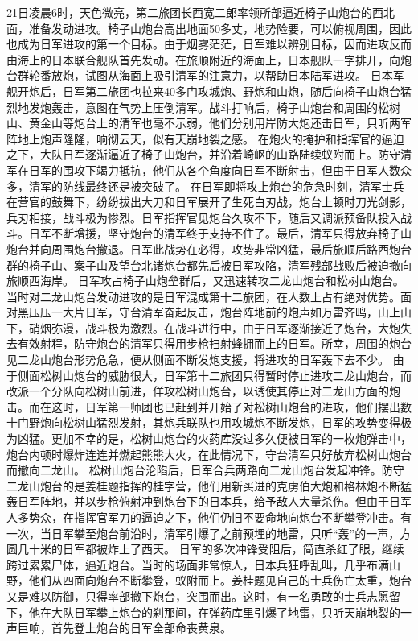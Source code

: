 \documentclass[12pt,UTF8]{ctexbook}
\begin{document}
21日凌晨6时，天色微亮，第二旅团长西宽二郎率领所部逼近椅子山炮台的西北面，准备发动进攻。椅子山炮台高出地面50多丈，地势险要，可以俯视周围，因此也成为日军进攻的第一个目标。由于烟雾茫茫，日军难以辨别目标，因而进攻反而由海上的日本联合舰队首先发动。在旅顺附近的海面上，日本舰队一字排开，向炮台群轮番放炮，试图从海面上吸引清军的注意力，以帮助日本陆军进攻。
日本军舰开炮后，日军第二旅团也拉来40多门攻城炮、野炮和山炮，随后向椅子山炮台猛烈地发炮轰击，意图在气势上压倒清军。战斗打响后，椅子山炮台和周围的松树山、黄金山等炮台上的清军也毫不示弱，他们分别用岸防大炮还击日军，只听两军阵地上炮声隆隆，响彻云天，似有天崩地裂之感。
在炮火的掩护和指挥官的逼迫之下，大队日军逐渐逼近了椅子山炮台，并沿着崎岖的山路陆续蚁附而上。防守清军在日军的围攻下竭力抵抗，他们从各个角度向日军不断射击，但由于日军人数众多，清军的防线最终还是被突破了。
在日军即将攻上炮台的危急时刻，清军士兵在营官的鼓舞下，纷纷拔出大刀和日军展开了生死白刃战，炮台上顿时刀光剑影，兵刃相接，战斗极为惨烈。日军指挥官见炮台久攻不下，随后又调派预备队投入战斗。日军不断增援，坚守炮台的清军终于支持不住了。最后，清军只得放弃椅子山炮台并向周围炮台撤退。日军此战势在必得，攻势非常凶猛，最后旅顺后路西炮台群的椅子山、案子山及望台北诸炮台都先后被日军攻陷，清军残部战败后被迫撤向旅顺西海岸。
日军攻占椅子山炮垒群后，又迅速转攻二龙山炮台和松树山炮台。当时对二龙山炮台发动进攻的是日军混成第十二旅团，在人数上占有绝对优势。面对黑压压一大片日军，守台清军奋起反击，炮台阵地前的炮声如万雷齐鸣，山上山下，硝烟弥漫，战斗极为激烈。在战斗进行中，由于日军逐渐接近了炮台，大炮失去有效射程，防守炮台的清军只得用步枪扫射蜂拥而上的日军。所幸，周围的炮台见二龙山炮台形势危急，便从侧面不断发炮支援，将进攻的日军轰下去不少。
由于侧面松树山炮台的威胁很大，日军第十二旅团只得暂时停止进攻二龙山炮台，而改派一个分队向松树山前进，佯攻松树山炮台，以诱使其停止对二龙山方面的炮击。而在这时，日军第一师团也已赶到并开始了对松树山炮台的进攻，他们摆出数十门野炮向松树山猛烈发射，其炮兵联队也用攻城炮不断发炮，日军的攻势变得极为凶猛。更加不幸的是，松树山炮台的火药库没过多久便被日军的一枚炮弹击中，炮台内顿时爆炸连连并燃起熊熊大火，在此情况下，守台清军只好放弃松树山炮台而撤向二龙山。
松树山炮台沦陷后，日军合兵两路向二龙山炮台发起冲锋。防守二龙山炮台的是姜桂题指挥的桂字营，他们用新买进的克虏伯大炮和格林炮不断猛轰日军阵地，并以步枪俯射冲到炮台下的日本兵，给予敌人大量杀伤。但由于日军人多势众，在指挥官军刀的逼迫之下，他们仍旧不要命地向炮台不断攀登冲击。有一次，当日军攀至炮台前沿时，清军引爆了之前预埋的地雷，只听“轰”的一声，方圆几十米的日军都被炸上了西天。
日军的多次冲锋受阻后，简直杀红了眼，继续跨过累累尸体，逼近炮台。当时的场面非常惊人，日本兵狂呼乱叫，几乎布满山野，他们从四面向炮台不断攀登，蚁附而上。姜桂题见自己的士兵伤亡太重，炮台又是难以防御，只得率部撤下炮台，突围而出。这时，有一名勇敢的士兵志愿留下，他在大队日军攀上炮台的刹那间，在弹药库里引爆了地雷，只听天崩地裂的一声巨响，首先登上炮台的日军全部命丧黄泉。
\end{document}
